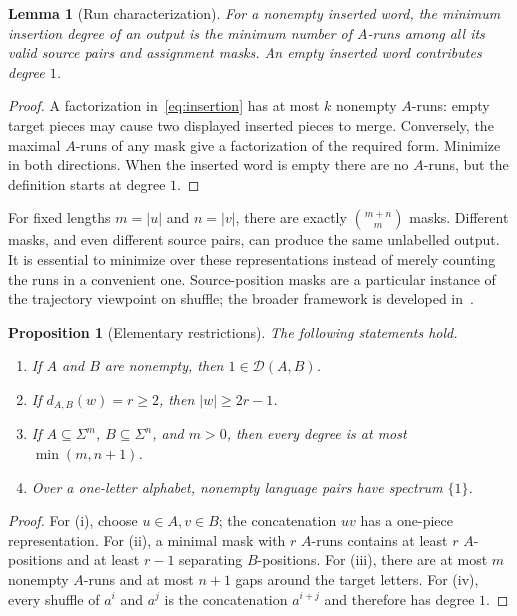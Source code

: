 \documentclass[11pt,letterpaper]{article}
\newtheorem{lemma}[theorem]{Lemma}
\newtheorem{proposition}[theorem]{Proposition}
\theoremstyle{definition}\newtheorem{definition}[theorem]{Definition}
\theoremstyle{remark}\newtheorem{remark}[theorem]{Remark}
\theoremstyle{definition}\newtheorem{question}[theorem]{Question}
\newcommand{\spec}[2]{\mathcal D(#1,#2)}
\begin{document}
\begin{lemma}[Run characterization]\label{lem:runs}
For a nonempty inserted word, the minimum insertion degree of an output is the minimum number of $A$-runs among all its valid source pairs and assignment masks. An empty inserted word contributes degree $1$.
\end{lemma}
\begin{proof}
A factorization in~\eqref{eq:insertion} has at most $k$ nonempty $A$-runs: empty target pieces may cause two displayed inserted pieces to merge. Conversely, the maximal $A$-runs of any mask give a factorization of the required form. Minimize in both directions. When the inserted word is empty there are no $A$-runs, but the definition starts at degree $1$.
\end{proof}

For fixed lengths $m=|u|$ and $n=|v|$, there are exactly $\binom{m+n}{m}$ masks. Different masks, and even different source pairs, can produce the same unlabelled output. It is essential to minimize over these representations instead of merely counting the runs in a convenient one. Source-position masks are a particular instance of the trajectory viewpoint on shuffle; the broader framework is developed in~\cite{Mateescu1998}.

\begin{proposition}[Elementary restrictions]\label{prop:bounds}
The following statements hold.
\begin{enumerate}[label=(\roman*),nosep]
\item If $A$ and $B$ are nonempty, then $1\in\spec{A}{B}$.
\item If $d_{A,B}(w)=r\geq2$, then $|w|\geq2r-1$.
\item If $A\subseteq\Sigma^m$, $B\subseteq\Sigma^n$, and $m>0$, then every degree is at most $\min(m,n+1)$.
\item Over a one-letter alphabet, nonempty language pairs have spectrum $\{1\}$.
\end{enumerate}
\end{proposition}
\begin{proof}
For (i), choose $u\in A,v\in B$; the concatenation $uv$ has a one-piece representation. For (ii), a minimal mask with $r$ $A$-runs contains at least $r$ $A$-positions and at least $r-1$ separating $B$-positions. For (iii), there are at most $m$ nonempty $A$-runs and at most $n+1$ gaps around the target letters. For (iv), every shuffle of $a^i$ and $a^j$ is the concatenation $a^{i+j}$ and therefore has degree $1$.
\end{proof}
\end{document}
